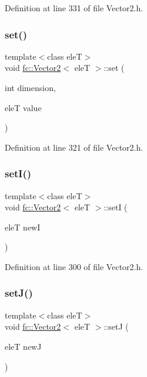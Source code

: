 Definition at line 331 of file Vector2.\+h.

\mbox{\label{classfc_1_1Vector2_aa89e17ff440cc8f05a7b537f78ba91cf}} 
\subsubsection{\texorpdfstring{set()}{set()}}
{\footnotesize\ttfamily template$<$class eleT$>$ \\
void \hyperlink{classfc_1_1Vector2}{fc\+::\+Vector2}$<$ eleT $>$\+::set (\begin{DoxyParamCaption}\item[{int}]{dimension,  }\item[{eleT}]{value }\end{DoxyParamCaption})}



Definition at line 321 of file Vector2.\+h.

\mbox{\label{classfc_1_1Vector2_adf4f9e486c5046d489d823b4f7c03a5d}} 
\subsubsection{\texorpdfstring{set\+I()}{setI()}}
{\footnotesize\ttfamily template$<$class eleT$>$ \\
void \hyperlink{classfc_1_1Vector2}{fc\+::\+Vector2}$<$ eleT $>$\+::setI (\begin{DoxyParamCaption}\item[{eleT}]{newI }\end{DoxyParamCaption})}



Definition at line 300 of file Vector2.\+h.

\mbox{\label{classfc_1_1Vector2_a4923fcc5867390a449fcb4b93cb2d0c7}} 
\subsubsection{\texorpdfstring{set\+J()}{setJ()}}
{\footnotesize\ttfamily template$<$class eleT$>$ \\
void \hyperlink{classfc_1_1Vector2}{fc\+::\+Vector2}$<$ eleT $>$\+::setJ (\begin{DoxyParamCaption}\item[{eleT}]{newJ }\end{DoxyParamCaption})}



